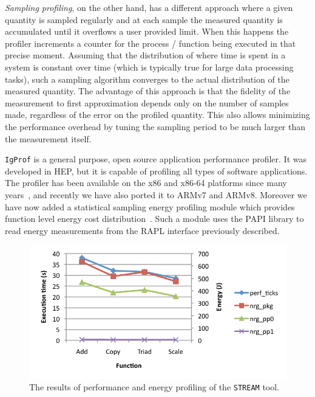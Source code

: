 {\it Sampling profiling}, on the other hand, has a different approach where
a given quantity is sampled regularly and at each sample the measured
quantity is accumulated until it overflows a user provided limit.
When this happens the profiler increments a counter for the process /
function being executed in that precise moment. Assuming that the
distribution of where time is spent in a system is constant
over time (which is typically true for large data processing tasks),
such a sampling algorithm converges to the actual distribution of the measured
quantity. The advantage of this approach is that the fidelity of
the measurement to first approximation depends only on the
number of samples made, regardless of the error on the profiled
quantity. This also allows minimizing the performance overhead by tuning the 
sampling period to be much larger than the measurement itself.

\texttt{IgProf} is a general purpose, open source application performance 
profiler. It was developed in HEP, but it is capable of profiling all 
types of software applications.
The profiler has been available on the x86 and x86-64 platforms
since many years~\cite{igprofchep04, igprof-web},
and recently we have also ported it to ARMv7 and ARMv8. 
Moreover we have now added a statistical sampling energy
profiling module which provides function level energy cost
distribution~\cite{weaver12}. Such a module uses the PAPI library
to read energy measurements from the RAPL interface previously
described.

\begin{figure}[tbp]
  \begin{center}
    \includegraphics{img/stream-pp-np.pdf}
  \end{center}
  \vspace{-20pt}
  \caption{The results of performance and energy profiling of the \texttt{STREAM} tool.}
  \label{fig:stream-pp-np}
\end{figure}

